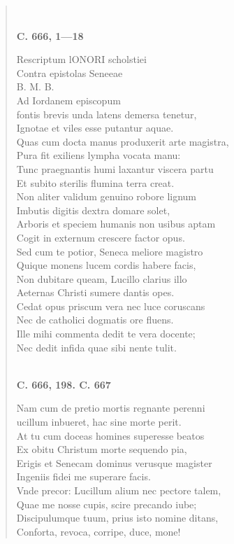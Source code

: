 \documentclass[11pt, a4paper]{report}
\begin{document}
\begin{verse}
        ﻿\pagebreak 
    \begin{center} \textbf{C. 666, 1—18} \end{center} \marginpar{[137]} Rescriptum lONORI scholstiei \\ Contra epistolas Seneeae \\ B. M. B. \\ Ad Iordanem episcopum \\ fontis brevis unda latens demersa tenetur, \\ Ignotae et viles esse putantur aquae. \\ Quas cum docta manus produxerit arte magistra, \\ Pura fit exiliens lympha vocata manu: \\ Tunc praegnantis humi laxantur viscera partu \\ Et subito sterilis flumina terra creat. \\ Non aliter validum genuino robore lignum \\ Imbutis digitis dextra domare solet, \\ Arboris et speciem humanis non usibus aptam \\ Cogit in externum crescere factor opus. \\ Sed cum te potior, Seneca meliore magistro \\ Quique monens lucem cordis habere facis, \\ Non dubitare queam, Lucillo clarius illo \\ Aeternas Christi sumere dantis opes. \\ Cedat opus priscum vera nec luce coruscans \\ Nec de catholici dogmatis ore fluens. \\ Ille mihi commenta dedit te vera docente; \\ Nec dedit infida quae sibi nente tulit. \\ 
        ﻿\pagebreak 
     \marginpar{[138]} \begin{center} \textbf{C. 666, 198. C. 667} \end{center}Nam cum de pretio mortis regnante perenni \\ ucillum inbueret, hac sine morte perit. \\ At tu cum doceas homines superesse beatos \\ Ex obitu Christum morte sequendo pia, \\ Erigis et Senecam dominus verusque magister \\ Ingeniis fidei me superare facis. \\ Vnde precor: Lucillum alium nec pectore talem, \\ Quae me nosse cupis, scire precando iube; \\ Discipulumque tuum, prius isto nomine ditans, \\ Conforta, revoca, corripe, duce, mone! \\ 
      \end{verse}
  
\end{document}
